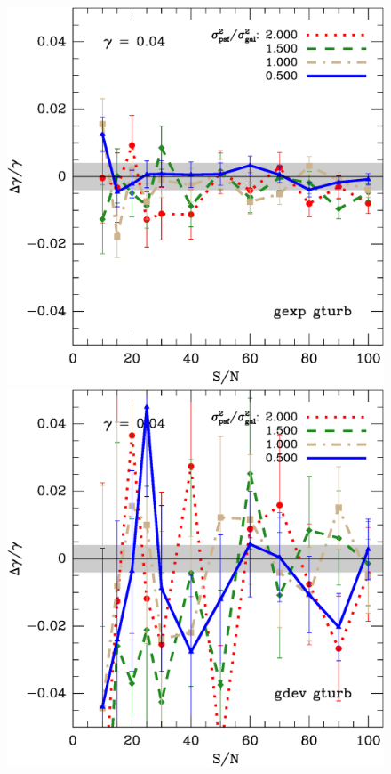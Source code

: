 \documentclass[12pt]{article}
\begin{document}
\begin{figure}[t]
\centering

\includegraphics[scale=0.4]{mcbayes-get01r05r06r07r08-yr-0.050-0.050-frac.eps}
\includegraphics[scale=0.4]{mcbayes-gdt02r11-yr-0.050-0.050-frac.eps}


\end{figure}
\end{document}
